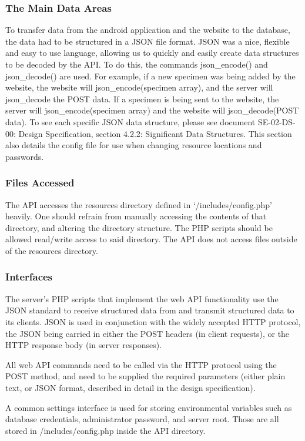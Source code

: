     \subsubsection{The Main Data Areas}
        To transfer data from the android application and the website to the database,  the data had to be structured in a JSON file format. JSON was a nice, flexible and easy to use language, allowing us to quickly and easily create data structures to be decoded by the API. To do this, the commands json\_encode() and json\_decode() are used. For example, if a new specimen was being added by the website, the website will json\_encode(specimen array), and the server will json\_decode the POST data. If a specimen is being sent to the website, the server will json\_encode(specimen array) and the website will json\_decode(POST data). To see each specific JSON data structure, please see document SE-02-DS-00: Design Specification, section 4.2.2: Significant Data Structures. This section also details the config file for use when changing resource locations and passwords. 

    \subsubsection{Files Accessed}
        The API accesses the resources directory defined in `/includes/config.php' heavily. One should refrain from manually accessing the contents of that directory, and altering the directory structure. The PHP scripts should be allowed read/write access to said directory. The API does not access files outside of the resources directory.

    \subsubsection{Interfaces}
        The server's PHP scripts that implement the web API functionality use the JSON standard to receive structured data from and transmit structured data to its clients. JSON is used in conjunction with the widely accepted HTTP protocol, the JSON being carried in either the POST headers (in client requests), or the HTTP response body (in server responses).
    
        All web API commands need to be called via the HTTP protocol using the POST method, and need to be supplied the required parameters (either plain text, or JSON format, described in detail in the design specification).
        
        A common settings interface is used for storing environmental variables such as database credentials, administrator password, and server root. Those are all stored in /includes/config.php inside the API directory.

